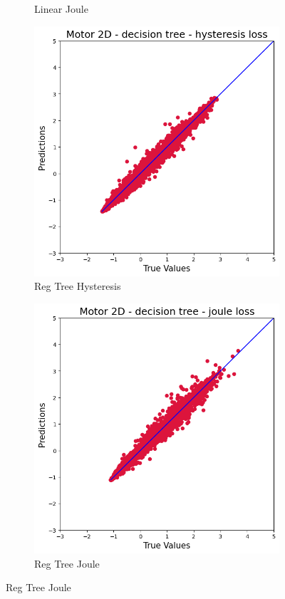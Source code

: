 \documentclass{article}
\begin{document}
\begin{figure}[!htbp]
\begin{subfigure}[b]{0.23\textwidth}
        \caption{Linear Joule}
    \end{subfigure}
    \hfill
    \begin{subfigure}[b]{0.23\textwidth}
        \centering
        \includegraphics[width=\textwidth]{images/2D/reg_tree_hysteresis.png}
        \caption{Reg Tree Hysteresis}
    \end{subfigure}
    \hfill
    \begin{subfigure}[b]{0.23\textwidth}
        \centering
        \includegraphics[width=\textwidth]{images/2D/reg_tree_joule.png}
        \caption{Reg Tree Joule}
    \end{subfigure}
    

\end{figure}
\end{document}
